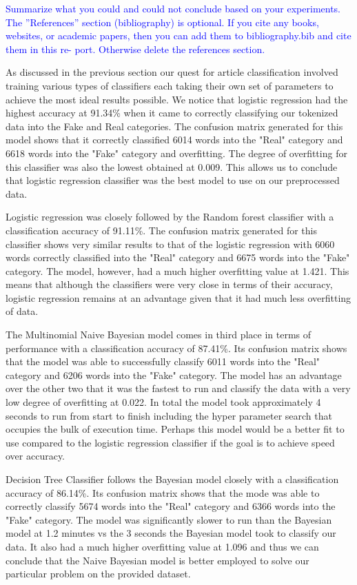 \documentclass[10pt,twocolumn,letterpaper]{article}
\begin{document}
\textcolor{blue}{Summarize what you could and could not conclude based on your experiments.
The ”References” section (bibliography) is optional. If you cite any books, websites, or academic papers, then you can add them to bibliography.bib and cite them in this re- port. Otherwise delete the references section.}

As discussed in the previous section our quest for article classification involved training various types of classifiers each taking their own set of parameters to achieve the most ideal results possible. We notice that logistic regression had the highest accuracy at 91.34\% when it came to correctly classifying our tokenized data into the Fake and Real categories. The confusion matrix generated for this model shows that it correctly classified 6014 words into the "Real" category and 6618 words into the "Fake" category and overfitting. The degree of overfitting for this classifier was also the lowest obtained at 0.009. This allows us to conclude that logistic regression classifier was the best model to use on our preprocessed data. 

Logistic regression was closely followed by the Random forest classifier with a classification accuracy of 91.11\%. The confusion matrix generated for this classifier shows very similar results to that of the logistic regression with 6060 words correctly classified into the "Real" category and 6675 words into the "Fake" category. The model, however, had a much higher overfitting value at 1.421. This means that although the classifiers were very close in terms of their accuracy, logistic regression remains at an advantage given that it had much less overfitting of data. 

The Multinomial Naive Bayesian model comes in third place in terms of performance with a classification accuracy of 87.41\%. Its confusion matrix shows that the model was able to successfully classify 6011 words into the "Real" category and 6206 words into the "Fake" category. The model has an advantage over the other two that it was the fastest to run and classify the data with a very low degree of overfitting at 0.022. In total the model took approximately 4 seconds to run from start to finish including the hyper parameter search that occupies the bulk of execution time. Perhaps this model would be a better fit to use compared to the logistic regression classifier if the goal is to achieve speed over accuracy. 

Decision Tree Classifier follows the Bayesian model closely with a classification accuracy of 86.14\%. Its confusion matrix shows that the mode was able to correctly classify 5674 words into the "Real" category and 6366 words into the "Fake" category. The model was significantly slower to run than the Bayesian model at 1.2 minutes vs the 3 seconds the Bayesian model took to classify our data. It also had a much higher overfitting value at 1.096 and thus we can conclude that the Naive Bayesian model is better employed to solve our particular problem on the provided dataset.  
\end{document}
